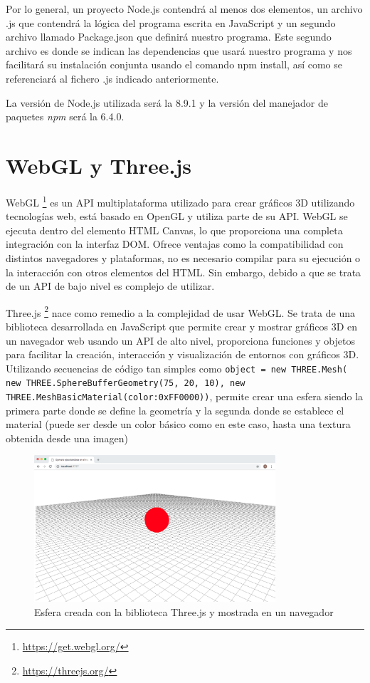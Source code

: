 Por lo general, un proyecto Node.js contendrá al menos dos elementos, un archivo .js que contendrá la lógica del programa escrita en JavaScript y un segundo archivo llamado Package.json que definirá nuestro programa. Este segundo archivo es donde se indican las dependencias que usará nuestro programa y nos facilitará su instalación conjunta usando el comando npm install, así como se referenciará al fichero .js indicado anteriormente.

La versión de Node.js utilizada será la 8.9.1 y la versión del manejador de paquetes \textit{npm} será la 6.4.0.

\section{WebGL y Three.js}
WebGL \footnote{\url{https://get.webgl.org/}}  es un API multiplataforma utilizado para crear gráficos 3D utilizando tecnologías web, está basado en OpenGL y utiliza parte de su API. WebGL se ejecuta dentro del elemento HTML Canvas, lo que proporciona una completa integración con la interfaz DOM. Ofrece ventajas como la compatibilidad con distintos navegadores y plataformas, no es necesario compilar para su ejecución o la interacción con otros elementos del HTML. Sin embargo, debido a que se trata de un API de bajo nivel es complejo de utilizar.

Three.js \footnote{\url{https://threejs.org/}} nace como remedio a la complejidad de usar WebGL. Se trata de una biblioteca desarrollada en JavaScript que permite crear y mostrar gráficos 3D en un navegador web usando un API de alto nivel, proporciona funciones y objetos para facilitar la creación, interacción y visualización de entornos con gráficos 3D. Utilizando secuencias de código tan simples como \texttt{object = new THREE.Mesh( new THREE.SphereBufferGeometry(75, 20, 10), new THREE.MeshBasicMaterial({color:0xFF0000}))}, permite crear una esfera siendo la primera parte donde se define la geometría y la segunda donde se establece el material (puede ser desde un color básico como en este caso, hasta una textura obtenida desde una imagen)

\begin{figure}[H]
  \begin{center}
    \includegraphics[width=0.8\textwidth]{figures/esferathreejs.png}
		\caption{Esfera creada con la biblioteca Three.js y mostrada en un navegador}
		\label{fig.esferathreejs}
		\end{center}
\end{figure}

